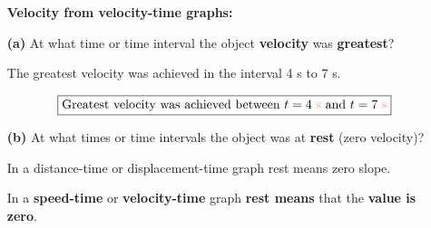 \documentclass[A4,12pt]{article}
\begin{document}
\begin{enumerate}[label=\bfseries (\arabic*)]
\begin{figure}[H]
    \centering
    \end{figure}
\begin{itemize}
    \item[] {\bf Velocity from velocity-time graphs:}
    \item[\bf (a)] At what time or time interval the object \textbf{velocity} was \textbf{greatest}?
    \begin{example}
    The greatest velocity was achieved in the interval 4 s to 7 s.
    
    \begin{equation*}
      \boxed{\text{Greatest velocity was achieved between }t=\tsis{4}\text{ and }t=\tsis{7}}
    \end{equation*}
    \end{example}
    \item[\bf (b)] At what times or time intervals the object was at \textbf{rest} (zero velocity)?
    \begin{example}
    In a distance-time or displacement-time graph rest means zero slope.
    
    In a \textbf{speed-time} or \textbf{velocity-time} graph \textbf{rest means} that the \textbf{value is zero}.
    

\end{example}
\end{itemize}
\end{enumerate}
\end{document}
